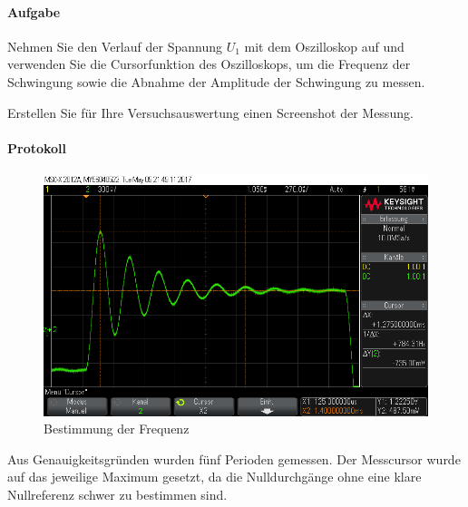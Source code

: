 \documentclass[10pt]{scrreprt}
\begin{document}
        \paragraph{Aufgabe}
        Nehmen Sie den Verlauf der Spannung $U_1$ mit dem Oszilloskop auf und verwenden
        Sie die Cursorfunktion des Oszilloskops, um die Frequenz der Schwingung
        sowie die Abnahme der Amplitude der Schwingung zu messen.

        \vspace{0.5cm}

        Erstellen Sie für Ihre Versuchsauswertung einen Screenshot der Messung.

        \paragraph{Protokoll}
        \begin{center}
            \begin{figure}[H]
                \includegraphics[width=\textwidth]{scope_12.png}
                \caption{Bestimmung der Frequenz}
            \end{figure}
        \end{center}

            Aus Genauigkeitsgründen wurden fünf Perioden gemessen. Der Messcursor
            wurde auf das jeweilige Maximum gesetzt, da die Nulldurchgänge ohne eine
            klare Nullreferenz schwer zu bestimmen sind.
\end{document}
